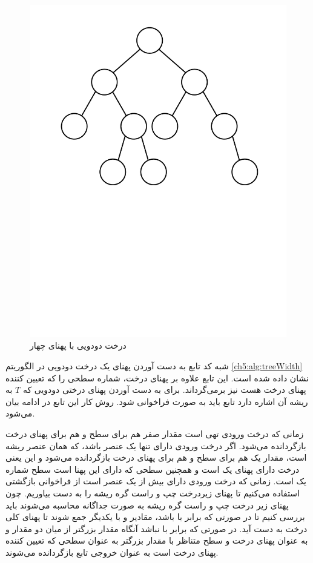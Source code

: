 \begin{figure}
\begin{center}
\includegraphics[scale=0.33]{figs/ch5/tree_width.pdf}
\end{center}\caption{درخت دودویی با پهنای چهار}\label{ch5:fig:treeWidth}
\end{figure}


شبه کد تابع به دست آوردن پهنای یک درخت دودویی در الگوریتم {\eqref{ch5:alg:treeWidth}} نشان داده شده است. این تابع علاوه بر پهنای درخت، شماره سطحی را که تعیین کننده پهنای درخت هست نیز برمی‌گرداند. برای به دست آوردن پهنای درختی دودویی که {$T$} به ریشه آن اشاره دارد تابع {} باید به صورت {} فراخوانی شود. روش کار این تابع در ادامه بیان می‌شود.

زمانی که درخت ورودی تهی است مقدار صفر هم برای سطح و هم برای پهنای درخت بازگردانده می‌شود. اگر درخت ورودی دارای تنها یک عنصر باشد، که همان عنصر ریشه است، مقدار یک هم برای سطح و هم برای پهنای درخت بازگردانده می‌شود و این یعنی درخت دارای پهنای یک است و همچنین سطحی که دارای این پهنا است سطح شماره یک است. زمانی که درخت ورودی دارای بیش از یک عنصر است از فراخوانی بازگشتی استفاده می‌کنیم تا پهنای زیردرخت چپ و راست گره ریشه را به دست بیاوریم. چون پهنای زیر درخت چپ و راست گره ریشه به صورت جداگانه محاسبه می‌شوند باید بررسی کنیم تا در صورتی که {} برابر با {} باشد، مقادیر {} و {} با یکدیگر جمع شوند تا پهنای کلی درخت به دست آید. در صورتی که {} برابر با {} نباشد آنگاه مقدار بزرگتر از میان دو مقدار {} و {} به عنوان پهنای درخت و سطح متناظر با مقدار بزرگتر به عنوان سطحی که تعیین کننده پهنای درخت است به عنوان خروجی تابع بازگردانده می‌شوند.


